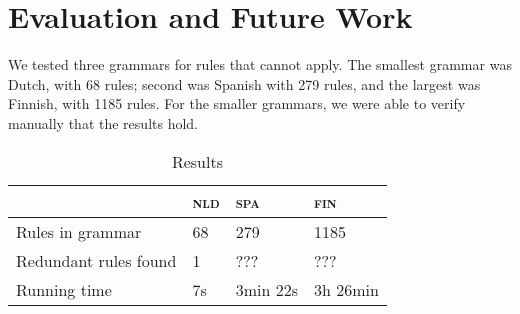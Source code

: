 \section{Evaluation and Future Work}

We tested three grammars for rules that cannot apply. The smallest grammar was Dutch, with 68 rules; second was Spanish with 279 rules, and the largest was Finnish, with 1185 rules.
For the smaller grammars, we were able to verify manually that the results hold.

\begin{table}[]
\centering
\begin{tabular}{|l|l|l|l|}
\hline
                         & \textsc{nld}  & \textsc{spa}  & \textsc{fin}  \\ \hline
Rules in grammar      & 68              & 279               & 1185              \\ \hline
Redundant rules found & 1               & ???               & ???    \\ \hline
Running time          & 7s              & 3min 22s          & 3h 26min    \\ \hline
\end{tabular}
\caption{Results}
\label{table:res}
\end{table}





